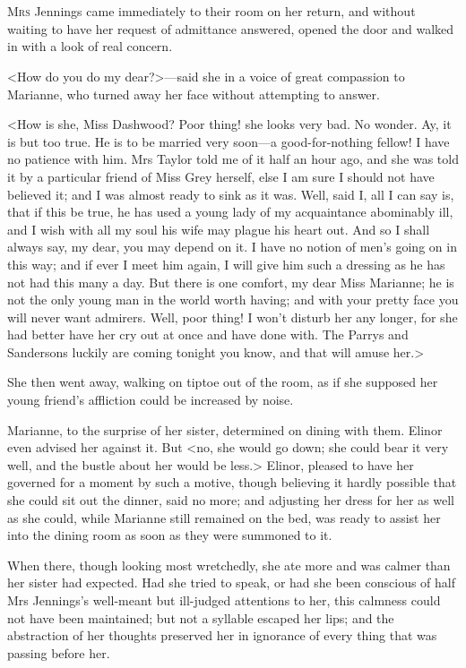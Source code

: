 \chapter[Chapter \thechapter]{}
\lettrine[lraise=0.3]{M}{rs} Jennings came immediately to their room on her return, and without waiting to have her request of admittance answered, opened the door and walked in with a look of real concern.

\zz
<How do you do my dear?>—said she in a voice of great compassion to Marianne, who turned away her face without attempting to answer.

<How is she, Miss Dashwood? Poor thing! she looks very bad. No wonder. Ay, it is but too true. He is to be married very soon—a good-for-nothing fellow! I have no patience with him. Mrs Taylor told me of it half an hour ago, and she was told it by a particular friend of Miss Grey herself, else I am sure I should not have believed it; and I was almost ready to sink as it was. Well, said I, all I can say is, that if this be true, he has used a young lady of my acquaintance abominably ill, and I wish with all my soul his wife may plague his heart out. And so I shall always say, my dear, you may depend on it. I have no notion of men's going on in this way; and if ever I meet him again, I will give him such a dressing as he has not had this many a day. But there is one comfort, my dear Miss Marianne; he is not the only young man in the world worth having; and with your pretty face you will never want admirers. Well, poor thing! I won't disturb her any longer, for she had better have her cry out at once and have done with. The Parrys and Sandersons luckily are coming tonight you know, and that will amuse her.>

She then went away, walking on tiptoe out of the room, as if she supposed her young friend's affliction could be increased by noise.

Marianne, to the surprise of her sister, determined on dining with them. Elinor even advised her against it. But <no, she would go down; she could bear it very well, and the bustle about her would be less.> Elinor, pleased to have her governed for a moment by such a motive, though believing it hardly possible that she could sit out the dinner, said no more; and adjusting her dress for her as well as she could, while Marianne still remained on the bed, was ready to assist her into the dining room as soon as they were summoned to it.

When there, though looking most wretchedly, she ate more and was calmer than her sister had expected. Had she tried to speak, or had she been conscious of half Mrs Jennings's well-meant but ill-judged attentions to her, this calmness could not have been maintained; but not a syllable escaped her lips; and the abstraction of her thoughts preserved her in ignorance of every thing that was passing before her.

